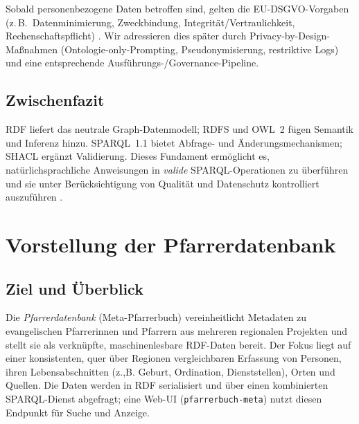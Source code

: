 Sobald personenbezogene Daten betroffen sind, gelten die EU-DSGVO-Vorgaben (z.\,B.\ Datenminimierung, Zweckbindung, Integrität/Vertraulichkeit, Rechenschaftspflicht) \cite{euGDPR2016}. Wir adressieren dies später durch Privacy-by-Design-Maßnahmen (Ontologie-only-Prompting, Pseudonymisierung, restriktive Logs) und eine entsprechende Ausführungs-/Governance-Pipeline.

\subsection*{Zwischenfazit}

RDF liefert das neutrale Graph-Datenmodell; RDFS und OWL~2 fügen Semantik und Inferenz hinzu. SPARQL~1.1 bietet Abfrage- und Änderungsmechanismen; SHACL ergänzt Validierung. Dieses Fundament ermöglicht es, natürlichsprachliche Anweisungen in \emph{valide} SPARQL-Operationen zu überführen und sie unter Berücksichtigung von Qualität und Datenschutz kontrolliert auszuführen \cite{Hitzler,RDF11Primer,RDFS11,OWL2Overview,SPARQL11Overview,hogan2021,perezGutierrezSparql,SHACL12}.







\section{Vorstellung der Pfarrerdatenbank}
\label{sec:Pfarrerdatenbank}

\subsection{Ziel und Überblick}
Die \emph{Pfarrerdatenbank} (Meta-Pfarrerbuch) vereinheitlicht Metadaten zu evangelischen Pfarrerinnen und Pfarrern aus mehreren regionalen Projekten und stellt sie als verknüpfte, maschinenlesbare RDF-Daten bereit. Der Fokus liegt auf einer konsistenten, quer über Regionen vergleichbaren Erfassung von Personen, ihren Lebensabschnitten (z.,B. Geburt, Ordination, Dienststellen), Orten und Quellen. Die Daten werden in RDF serialisiert und über einen kombinierten SPARQL-Dienst abgefragt; eine Web-UI (\texttt{pfarrerbuch-meta}) nutzt diesen Endpunkt für Suche und Anzeige.

